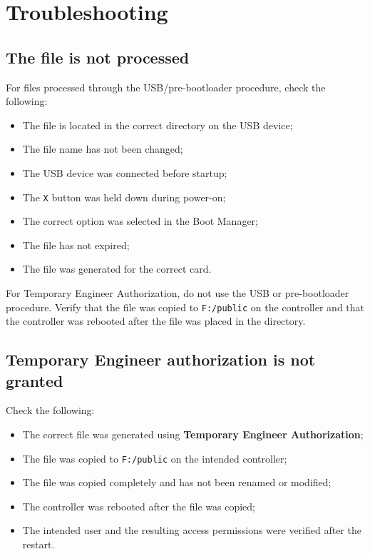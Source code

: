 ﻿\documentclass[11pt,a4paper]{article}
\newcommand{\button}[1]{\textbf{#1}}
\newcommand{\filename}[1]{\texttt{#1}}
\begin{document}
\section{Troubleshooting}

\subsection{The file is not processed}

For files processed through the USB/pre-bootloader procedure,
check the following:

\begin{itemize}
    \item The file is located in the correct directory on the
    USB device;
    \item The file name has not been changed;
    \item The USB device was connected before startup;
    \item The \texttt{X} button was held down during power-on;
    \item The correct option was selected in the Boot Manager;
    \item The file has not expired;
    \item The file was generated for the correct card.
\end{itemize}

For Temporary Engineer Authorization, do not use the USB
or pre-bootloader procedure. Verify that the file was copied
to \filename{F:/public} on the controller and that the controller
was rebooted after the file was placed in the directory.

\subsection{Temporary Engineer authorization is not granted}

Check the following:

\begin{itemize}
    \item The correct file was generated using
    \button{Temporary Engineer Authorization};
    \item The file was copied to \filename{F:/public} on the
    intended controller;
    \item The file was copied completely and has not been renamed
    or modified;
    \item The controller was rebooted after the file was copied;
    \item The intended user and the resulting access permissions
    were verified after the restart.
\end{itemize}
\end{document}
